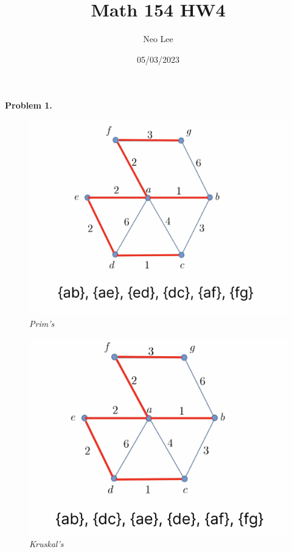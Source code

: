 \documentclass{article}
\title{Math 154 HW4}
\author{Neo Lee}
\date{05/03/2023}
\begin{document}
 

\maketitle 
\textbf{Problem 1.}
\begin{figure}[htb]
    \qquad
    \begin{minipage}{.4\textwidth}
        \centering
        {\includegraphics[scale=0.35]{prims.png}}
        \qquad\qquad\emph{Prim's}\label{fig:1}
    \end{minipage}    
    \qquad
    \begin{minipage}{.4\textwidth}
        \centering
        {\includegraphics[scale=0.35]{kruskal.png}}
        \qquad\qquad\emph{Kruskal's}\label{fig:2}
    \end{minipage}        
\end{figure} 
\bigbreak
\end{document}
